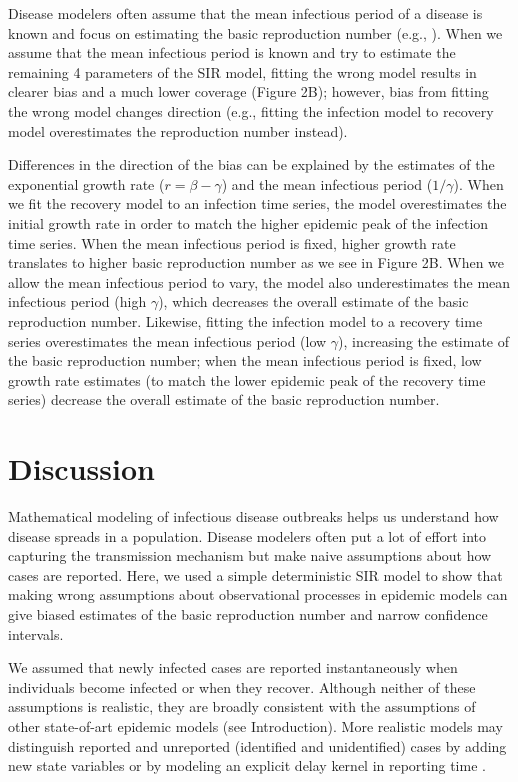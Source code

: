 \documentclass{article}\usepackage[]{graphicx}\usepackage[]{color}
\begin{document}
Disease modelers often assume that the mean infectious period of a disease
is known and focus on estimating the basic reproduction number (e.g.,
\cite{hooker2010parameterizing, lin2016seasonality, pons2018serotype}). 
When we assume that the mean infectious period is known
and try to estimate the remaining 4 parameters of the SIR model, fitting the
wrong model results in clearer bias and a much lower coverage (Figure 2B); however, 
bias from fitting the wrong model changes direction (e.g., fitting the infection
model to recovery model overestimates the reproduction number instead). 

Differences in the direction of the bias can be explained by the estimates of the
exponential growth rate ($r = \beta - \gamma$) and the mean infectious period ($1/\gamma$).
When we fit the recovery model to an infection time series, the model overestimates
the initial growth rate in order to match the higher epidemic peak of the 
infection time series. When the mean infectious period is fixed, higher growth rate
translates to higher basic reproduction number as we see in Figure 2B. When we allow
the mean infectious period to vary, the model also underestimates the mean infectious
period (high $\gamma$), which decreases the overall estimate of the basic reproduction number.
Likewise, fitting the infection model to a recovery time series overestimates the
mean infectious period (low $\gamma$), increasing the estimate of the basic reproduction number;
when the mean infectious period is fixed, low growth rate estimates (to match the
lower epidemic peak of the recovery time series) decrease the overall estimate of the
basic reproduction number.

\section{Discussion}

Mathematical modeling of infectious disease outbreaks helps us understand 
how disease spreads in a population. Disease modelers often put a lot of
effort into capturing the transmission mechanism but make naive assumptions
about how cases are reported. Here, we used a simple deterministic SIR model to show that 
making wrong assumptions about observational processes in epidemic models
can give biased estimates of the basic reproduction number and narrow
confidence intervals.

We assumed that newly infected cases are reported instantaneously when
individuals become infected or when they recover. Although neither of these
assumptions is realistic, they are broadly consistent with the assumptions
of other state-of-art epidemic models (see Introduction). 
More realistic models may distinguish reported and unreported
(identified and unidentified) cases by adding
new state variables \citep{browne2015modeling,webb2015model} 
or by modeling an explicit delay kernel in reporting time 
\citep{harris1990reporting, ferguson2001foot, ster2009epidemiological, 
birrell2011bayesian, funk2018real}.
\end{document}
